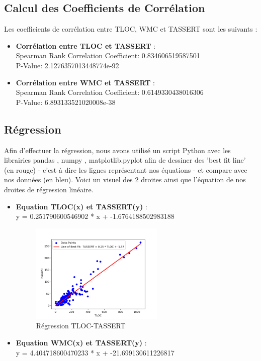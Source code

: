 \documentclass{proc}
\begin{document}
\begin{itemize}
\subsection{Calcul des Coefficients de Corrélation}
Les coefficients de corrélation entre TLOC, WMC et TASSERT sont les suivants :\\
\begin{itemize}

    \item \textbf{Corrélation entre TLOC et TASSERT} : \\Spearman Rank Correlation Coefficient: 0.834606519587501 \\
P-Value: 2.1276357013448774e-92
    \item  \textbf{Corrélation entre WMC et TASSERT} :\\ Spearman Rank Correlation Coefficient: 0.6149330438016306\\
P-Value: 6.893133521020008e-38
\end{itemize}
\subsection{Régression}
Afin d'effectuer la régression, nous avons utilisé un script Python avec les librairies pandas \cite{reback2020pandas}, numpy \cite{harris2020array}, matplotlib.pyplot \cite{Hunter:2007}afin de dessiner des 'best fit line' (en rouge) - c'est à dire les lignes représentant nos équations - et compare avec nos données (en bleu). Voici un visuel des 2 droites ainsi que l'équation de nos droites de régression linéaire.\\
\begin{itemize}
    \item  \textbf{Equation TLOC(x) et TASSERT(y)} : \\y = 0.251790600546902 * x + -1.6764188502983188
    \begin{figure}[H]
    \centering
    \includegraphics[width=0.6\textwidth]{images/tassert_tloc.png}
    \caption{Régression TLOC-TASSERT}
    \label{fig:Régression TLOC-TASSERT}
\end{figure}
    \item  \textbf{Equation WMC(x) et TASSERT(y)} : \\y = 4.404718600470233 * x + -21.699130611226817
   

\end{itemize}
\end{itemize}
\end{document}
